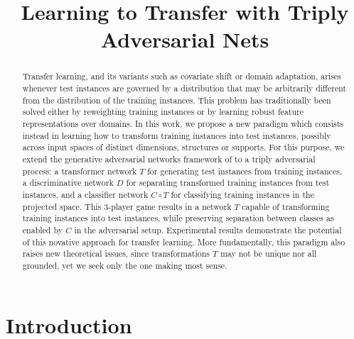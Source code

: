 \documentclass[aoas,preprint,authoryear]{imsart}
\begin{document}
\begin{frontmatter}
\title{Learning to Transfer with Triply Adversarial Nets}


\author{ }

\begin{abstract}

Transfer learning, and its variants such as covariate shift or
domain adaptation, arises whenever test instances are governed by a distribution
that may be arbitrarily different from the distribution of the training
instances. This problem has traditionally been solved either by reweighting
training instances or by learning robust feature representations over domains.
In this work, we propose a new paradigm which consists instead in learning how
to transform training instances into test instances, possibly across input
spaces of distinct dimensions, structures or supports. For this purpose, we
extend the generative adversarial networks framework of
\cite{goodfellow2014generative} to a triply adversarial process: a transformer
network $T$ for generating test instances from training instances, a
discriminative network $D$ for separating transformed training instances from
test instances, and a classifier network $C \circ T$ for classifying training
instances in the projected space. This 3-player game results in a network $T$
capable of transforming training instances into test instances, while preserving
separation between classes as enabled by $C$ in the adversarial setup.
Experimental results demonstrate the potential of this novative approach for
transfer learning.  More fundamentally, this paradigm also raises new
theoretical issues, since transformations $T$  may not be unique nor all
grounded, yet we seek only the one making most sense.

\end{abstract}

\end{frontmatter}

\section{Introduction}
\end{document}
